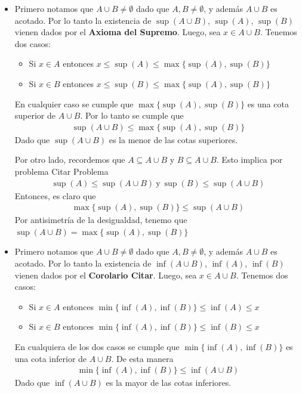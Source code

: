 \documentclass[12pt]{book}
\begin{document}
\begin{itemize}
    \item[\textbf{a)}] Primero notamos que $A \cup B \neq \emptyset$ dado que $A,B \neq \emptyset$, y además $A \cup B$ es acotado. Por lo tanto la existencia de $\sup(A\cup B)$, $\sup(A)$, $\sup(B)$ vienen dados por el \textbf{Axioma del Supremo}. Luego, sea $x \in A\cup B$. Tenemos dos casos:

\begin{itemize}
    \item Si $x \in A$ entonces $x \leq \sup(A) \leq \max\{\sup(A),\sup(B)\}$
    \item Si $x \in B$ entonces $x \leq \sup(B) \leq \max\{ \sup(A),\sup(B)\}$
\end{itemize}
En cualquier caso se cumple que $\max\{\sup(A),\sup(B)\}$ es una cota superior
 de $A\cup B$. Por lo tanto se cumple que 
\begin{align*}
    \sup(A \cup B) \leq \max\{ \sup(A),\sup(B)\}
\end{align*}
Dado que $\sup(A\cup B)$ es la menor de las cotas superiores.

Por otro lado, recordemos que $A \subseteq A  \cup B$ y $B \subseteq A\cup B$. Esto implica por problema {\Large Citar Problema} 
\begin{align*}
    \sup(A)\leq \sup(A\cup B) \ \text{y} \ \sup(B) \leq \sup(A \cup B)
\end{align*}
Entonces, es claro que 
\begin{align*}
    \max\{\sup(A),\sup(B)\} \leq \sup(A\cup B)
\end{align*}
Por antisimetría de la desigualdad, tenemo que $\sup(A\cup B) = \max\{\sup(A),\sup(B)\}$

\item[\textbf{b)}] Primero notamos que $A \cup B \neq \emptyset$ dado que $A,B \neq \emptyset$, y además $A \cup B$ es acotado. Por lo tanto la existencia de $\inf(A\cup B)$, $\inf(A)$, $\inf(B)$ vienen dados por el \textbf{Corolario Citar}. Luego, sea $x \in A\cup B$. Tenemos dos casos:
\begin{itemize}
    \item Si $x \in A$ entonces $\min\{\inf(A),\inf(B)\} \leq \inf(A) \leq x$
    \item Si $x \in B$ entonces $\min\{\inf(A),\inf(B)\} \leq \inf(B) \leq x$
\end{itemize}
En cualquiera de los dos casos se cumple que $\min\{\inf(A),\inf(B)\}$ es una cota inferior de $A\cup B$. De esta manera 
\begin{align*}
    \min\{\inf(A),\inf(B)\} \leq \inf(A\cup B)
\end{align*}
Dado que $ \inf(A\cup B)$ es la mayor de las cotas inferiores.


\end{itemize}
\end{document}
